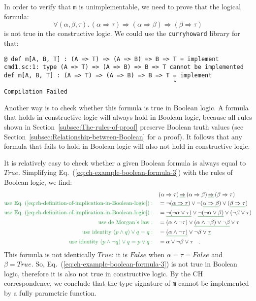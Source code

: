 In order to verify that \lstinline!m! is unimplementable, we need
to prove that the logical formula:
\begin{equation}
\forall(\alpha,\beta,\tau).\,(\alpha\Rightarrow\tau)\Rightarrow(\alpha\Rightarrow\beta)\Rightarrow(\beta\Rightarrow\tau)\label{eq:ch-example-boolean-formula-3}
\end{equation}
is not true in the constructive logic. We could use the \lstinline!curryhoward!
library for that:
\begin{lstlisting}
@ def m[A, B, T] : (A => T) => (A => B) => B => T = implement
cmd1.sc:1: type (A => T) => (A => B) => B => T cannot be implemented
def m[A, B, T] : (A => T) => (A => B) => B => T = implement
                                                ^
Compilation Failed
\end{lstlisting}
Another way is to check whether this formula is true in Boolean logic.
A formula that holds in constructive logic will always hold in Boolean
logic, because all rules shown in Section~\ref{subsec:The-rules-of-proof}
preserve Boolean truth values (see Section~\ref{subsec:Relationship-between-Boolean}
for a proof). It follows that any formula that fails to hold in Boolean
logic will also not hold in constructive logic. 

It is relatively easy to check whether a given Boolean formula is
always equal to $True$. Simplifying Eq.~(\ref{eq:ch-example-boolean-formula-3})
with the rules of Boolean logic, we find:
\begin{align*}
 & (\alpha\Rightarrow\tau)\,\gunderline{\Rightarrow}\,(\alpha\Rightarrow\beta)\,\gunderline{\Rightarrow}\,(\beta\Rightarrow\tau)\\
{\color{greenunder}\text{use Eq.~(\ref{eq:ch-definition-of-implication-in-Boolean-logic})}:}\quad & =\neg(\gunderline{\alpha\Rightarrow\tau})\vee\neg(\gunderline{\alpha\Rightarrow\beta})\vee(\gunderline{\beta\Rightarrow\tau})\\
{\color{greenunder}\text{use Eq.~(\ref{eq:ch-definition-of-implication-in-Boolean-logic})}:}\quad & =\gunderline{\neg(\neg\alpha\vee\tau)}\vee\gunderline{\neg(\neg\alpha\vee\beta)}\vee(\neg\beta\vee\tau)\\
{\color{greenunder}\text{use de Morgan\textsf{'}s law}:}\quad & =\left(\alpha\wedge\neg\tau\right)\vee\gunderline{\left(\alpha\wedge\neg\beta\right)\vee\neg\beta}\vee\tau\\
{\color{greenunder}\text{use identity }(p\wedge q)\vee q=q:}\quad & =\gunderline{\left(\alpha\wedge\neg\tau\right)}\vee\neg\beta\vee\gunderline{\tau}\\
{\color{greenunder}\text{use identity }(p\wedge\neg q)\vee q=p\vee q:}\quad & =\alpha\vee\neg\beta\vee\tau\quad.
\end{align*}
This formula is not identically $True$: it is $False$ when $\alpha=\tau=False$
and $\beta=True$. So, Eq.~(\ref{eq:ch-example-boolean-formula-3})
is not true in Boolean logic, therefore it is also not true in constructive
logic. By the CH correspondence, we conclude that the type signature
of \lstinline!m! cannot be implemented by a fully parametric function.

